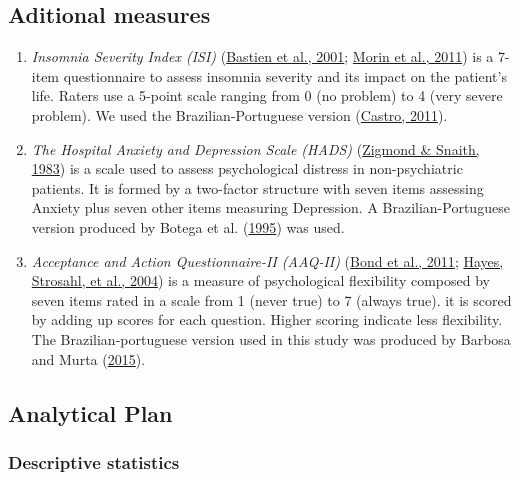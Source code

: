 \documentclass[
  ,doc,11pt, twoside,floatsintext]{apa6}
\begin{document}
\hypertarget{aditional-measures}{%
\subsection{Aditional measures}\label{aditional-measures}}

\begin{enumerate}
\def\labelenumi{\arabic{enumi}.}
\item
  \emph{Insomnia Severity Index (ISI)} (\protect\hyperlink{ref-bastien2001}{Bastien et al., 2001}; \protect\hyperlink{ref-morin2011a}{Morin et al., 2011}) is a 7-item questionnaire to assess insomnia severity and its impact on the patient's life. Raters use a 5-point scale ranging from 0 (no problem) to 4 (very severe problem). We used the Brazilian-Portuguese version (\protect\hyperlink{ref-castro}{Castro, 2011}).
\item
  \emph{The Hospital Anxiety and Depression Scale (HADS)} (\protect\hyperlink{ref-zigmond1983hospital}{Zigmond \& Snaith, 1983}) is a scale used to assess psychological distress in non-psychiatric patients. It is formed by a two-factor structure with seven items assessing Anxiety plus seven other items measuring Depression. A Brazilian-Portuguese version produced by Botega et al. (\protect\hyperlink{ref-botega1995transtornos}{1995}) was used.
\item
  \emph{Acceptance and Action Questionnaire-II (AAQ-II)} (\protect\hyperlink{ref-bond2011preliminary}{Bond et al., 2011}; \protect\hyperlink{ref-hayes2004measuring}{Hayes, Strosahl, et al., 2004}) is a measure of psychological flexibility composed by seven items rated in a scale from 1 (never true) to 7 (always true). it is scored by adding up scores for each question. Higher scoring indicate less flexibility. The Brazilian-portuguese version used in this study was produced by Barbosa and Murta (\protect\hyperlink{ref-barbosa2015propriedades}{2015}).
\end{enumerate}

\hypertarget{analytical-plan}{%
\subsection{Analytical Plan}\label{analytical-plan}}

\hypertarget{descriptive-statistics}{%
\subsubsection{Descriptive statistics}\label{descriptive-statistics}}
\end{document}
